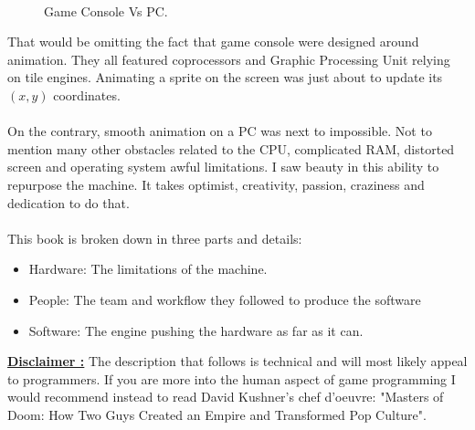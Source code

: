 \\
\begin{figure}[H]
\centering
   \caption{Game Console Vs PC.} \label{fig:game_console_vs_PC}
 \end{figure}
 
That would be omitting the fact that game console were designed around animation. They all featured coprocessors and Graphic Processing Unit relying on tile engines. Animating a sprite on the screen was just about to update its $(x,y)$ coordinates.\\
\\
On the contrary, smooth animation on a PC was next to impossible. Not to mention many other obstacles related to the CPU, complicated RAM, distorted screen and operating system awful limitations. I saw beauty in this ability to repurpose the machine. It takes optimist, creativity, passion, craziness and dedication to do that.\\
\\
This book is broken down in three parts and details:\\
\begin{itemize}
\item Hardware: The limitations of the machine.
\item People: The team and workflow they followed to produce the software
\item Software: The engine pushing the hardware as far as it can.
\end{itemize}

 \textbf{\underline{Disclaimer :}} The description that follows is technical and will most likely appeal to programmers. If you are more into the human aspect of game programming I would recommend instead to read David Kushner's chef d'oeuvre: "Masters of Doom: How Two Guys Created an Empire and Transformed Pop Culture".